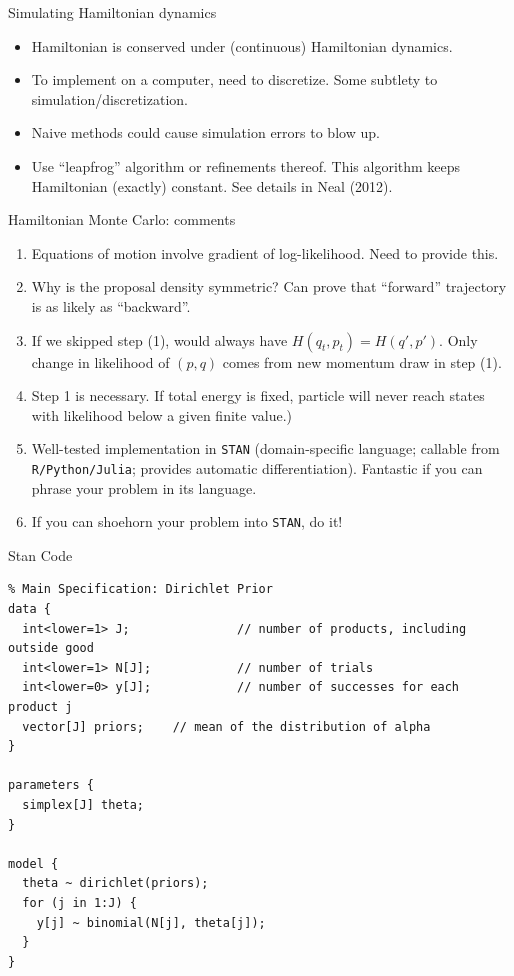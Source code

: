 \documentclass[aspectratio=169]{beamer}
\begin{document}
\begin{frame}{Simulating Hamiltonian dynamics}
\begin{itemize}
	\item Hamiltonian is conserved under (continuous) Hamiltonian dynamics.
	\item To implement on a computer, need to discretize.  Some subtlety to simulation/discretization. 
	\item Naive methods could cause simulation errors to blow up.
	\item Use ``leapfrog'' algorithm or refinements thereof.  This algorithm keeps Hamiltonian (exactly) constant.  See details in Neal (2012).
\end{itemize}
\end{frame}

\begin{frame}{Hamiltonian Monte Carlo: comments}
\begin{enumerate}
	\item Equations of motion involve gradient of log-likelihood.  Need to provide this.
	\item Why is the proposal density symmetric?  Can prove that ``forward'' trajectory is as likely as ``backward''.
	\item If we skipped step (1), would always have $H(q_t,p_t) = H(q',p')$.  Only change in likelihood of $(p,q)$ comes from new momentum draw in step (1).
	\item Step 1 is necessary. If total energy is fixed, particle will never reach states with likelihood below a given finite value.)
	\item Well-tested implementation in \texttt{STAN} (domain-specific language; callable from \texttt{R/Python/Julia}; provides automatic differentiation).  Fantastic if you can phrase your problem in its language.
	\item If you can shoehorn your problem into \texttt{STAN}, do it!
\end{enumerate}
\end{frame}


\begin{frame}[fragile]{Stan Code}
\footnotesize
\begin{verbatim}
% Main Specification: Dirichlet Prior
data {
  int<lower=1> J;               // number of products, including outside good
  int<lower=1> N[J];            // number of trials
  int<lower=0> y[J];            // number of successes for each product j
  vector[J] priors;    // mean of the distribution of alpha
}

parameters {
  simplex[J] theta;
}

model {
  theta ~ dirichlet(priors);
  for (j in 1:J) {
    y[j] ~ binomial(N[j], theta[j]);
  }
}
\end{verbatim}
\end{frame}
\end{document}
